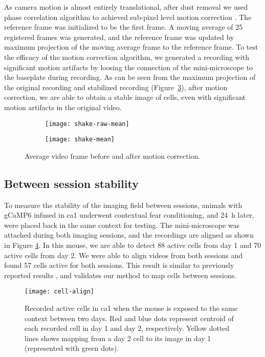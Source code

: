 As camera motion is almost entirely translational, after dust removal we used phase correlation algorithm to achieved sub-pixel level motion correction \citep{guizar08}. The reference frame was initialized to be the first frame. A moving average of 25 registered frames was generated, and the reference frame was updated by maximum projection of the moving average frame to the reference frame. To test the efficacy of the motion correction algorithm, we generated a recording with significant motion artifacts by loosing the connection of the mini-microscope to the baseplate during recording. As can be seen from the maximum projection of the original recording and stabilized recording (Figure~\ref{f.motion}), after motion correction, we are able to obtain a stable image of cells, even with significant motion artifacts in the original video.
\begin{figure}[h]
    \begin{subfigure}[t]{.5\textwidth}
        \centering
        \texttt{[image: shake-raw-mean]}
        \caption{\label{motion.orig}}
    \end{subfigure}
    \begin{subfigure}[t]{.5\textwidth}
        \centering
        \texttt{[image: shake-mean]}
        \caption{\label{motion.corrected}}
    \end{subfigure}
    \caption[Motion correction.]{Average video frame before and after motion correction. \label{f.motion}}
\end{figure}


\subsection{Between session stability}
To measure the stability of the imaging field between sessions, animals with gCaMP6 infused in \gls{ca1} underwent contextual fear conditioning, and \SI{24}{\hour} later, were placed back in the same context for testing. The mini-microscope was attached during both imaging sessions, and the recordings are aligned as shown in Figure \ref{f.cellalign}. In this mouse, we are able to detect 88 active cells from day 1 and 70 active cells from day 2. We were able to align videos from both sessions and found 57 cells active for both sessions. This result is similar to previously reported results \citep{ziv13}, and validates our method to map cells between sessions.

\begin{figure}[h]
    \centering
    \texttt{[image: cell-align]}
    \caption[Cell alignment between sessions.]{Recorded active cells in \gls{ca1} when the mouse is exposed to the same context between two days. Red and blue dots represent centroid of each recorded cell in day 1 and day 2, respectively. Yellow dotted lines shows mapping from a day 2 cell to its image in day 1 (represented with green dots). \label{f.cellalign}}
\end{figure}



